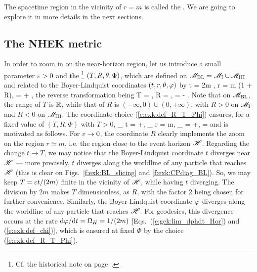 The spacetime region in the vicinity of $r=m$ is called the
.
We are going to explore it in more details in the next sections.

\subsection{The NHEK metric} \label{s:exk:NHEK_metric}

In order to zoom in on the near-horizon region, let us introduce
a small parameter $\varepsilon >0$ and
the \footnote{Cf. the historical note on
page~\pageref{h:exk:NHEK_metric}.} $(T,R,\theta,\Phi)$, which are defined on $\mathscr{M}_{\rm BL} = \mathscr{M}_{\rm I} \cup \mathscr{M}_{\rm III}$
and related to the Boyer-Lindquist coordinates
$(t,r,\theta,\varphi)$ by
\be \label{e:exk:def_R_T_Phi}
    t = 2m ,\quad
    r = m (1 + \veps R),\quad
    \ph = \Phi +  ,
\ee
the reverse transformation being
\be \label{e:exk:R_T_Phi_BL}
    T = \veps {}, \quad
    R = , \quad
    \Phi = \ph -  .
\ee
Note that on $\mathscr{M}_{\rm BL}$, the range of $T$ is $\mathbb{R}$, while
that of $R$ is $(-\infty,0)\cup(0,+\infty)$, with $R>0$ on $\mathscr{M}_{\rm I}$
and $R<0$ on $\mathscr{M}_{\rm III}$.
The coordinate choice (\ref{e:exk:def_R_T_Phi}) ensures, for a fixed value of $(T,R,\Phi)$ with $T>0$,
\be
    \lim_{\veps{}} t = +\infty,\quad
    \lim_{\veps{}} r = m, \quad
    \lim_{\veps{}} \ph = +\infty,\quad
     = 
\ee
and is motivated as follows.
For $\varepsilon\to 0$,
the coordinate $R$ clearly implements the zoom on the region $r\simeq m$,
i.e. the region close to the event horizon $\mathscr{H}$.
Regarding the change $t\to T$, we may notice that the Boyer-Lindquist coordinate
$t$ diverges near  $\mathscr{H}$ --- more precisely,
$t$ diverges along the worldline of any particle that reaches $\mathscr{H}$
(this is clear on Figs.~\ref{f:exk:BL_slicing} and \ref{f:exk:CPdiag_BL}).
So, we may keep $T = \varepsilon t/(2m)$ finite in the vicinity of $\mathscr{H}$, while having
$t$ diverging. The division by $2m$ makes $T$ dimensionless, as $R$, with the
factor $2$ being chosen for further convenience.
Similarly, the Boyer-Lindquist coordinate $\varphi$ diverges along the worldline of any particle that reaches $\mathscr{H}$.
For geodesics, this divergence occurs at the rate $\mathrm{d}\varphi/\mathrm{d} t = \Omega_H = 1/(2m)$
[Eqs.~(\ref{e:gek:lim_dphdt_Hor}) and (\ref{e:exk:def_chi})], which is ensured
at fixed $\Phi$ by the choice (\ref{e:exk:def_R_T_Phi}).

